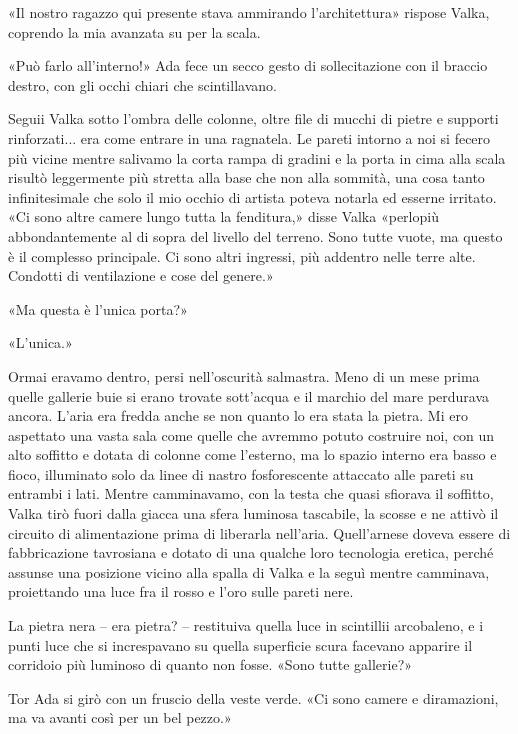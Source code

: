 «Il nostro ragazzo qui presente stava ammirando l'architettura» rispose
Valka, coprendo la mia avanzata su per la scala.

«Può farlo all'interno!» Ada fece un secco gesto di sollecitazione con
il braccio destro, con gli occhi chiari che scintillavano.

Seguii Valka sotto l'ombra delle colonne, oltre file di mucchi di pietre
e supporti rinforzati... era come entrare in una ragnatela. Le pareti
intorno a noi si fecero più vicine mentre salivamo la corta rampa di
gradini e la porta in cima alla scala risultò leggermente più stretta
alla base che non alla sommità, una cosa tanto infinitesimale che solo
il mio occhio di artista poteva notarla ed esserne irritato. «Ci sono
altre camere lungo tutta la fenditura,» disse Valka «perlopiù
abbondantemente al di sopra del livello del terreno. Sono tutte vuote,
ma questo è il complesso principale. Ci sono altri ingressi, più
addentro nelle terre alte. Condotti di ventilazione e cose del genere.»

«Ma questa è l'unica porta?»

«L'unica.»

Ormai eravamo dentro, persi nell'oscurità salmastra. Meno di un mese
prima quelle gallerie buie si erano trovate sott'acqua e il marchio del
mare perdurava ancora. L'aria era fredda anche se non quanto lo era
stata la pietra. Mi ero aspettato una vasta sala come quelle che avremmo
potuto costruire noi, con un alto soffitto e dotata di colonne come
l'esterno, ma lo spazio interno era basso e fioco, illuminato solo da
linee di nastro fosforescente attaccato alle pareti su entrambi i lati.
Mentre camminavamo, con la testa che quasi sfiorava il soffitto, Valka
tirò fuori dalla giacca una sfera luminosa tascabile, la scosse e ne
attivò il circuito di alimentazione prima di liberarla nell'aria.
Quell'arnese doveva essere di fabbricazione tavrosiana e dotato di una
qualche loro tecnologia eretica, perché assunse una posizione vicino
alla spalla di Valka e la seguì mentre camminava, proiettando una luce
fra il rosso e l'oro sulle pareti nere.

La pietra nera -- era pietra? -- restituiva quella luce in scintillii
arcobaleno, e i punti luce che si increspavano su quella superficie
scura facevano apparire il corridoio più luminoso di quanto non fosse.
«Sono tutte gallerie?»

Tor Ada si girò con un fruscio della veste verde. «Ci sono camere e
diramazioni, ma va avanti così per un bel pezzo.»

